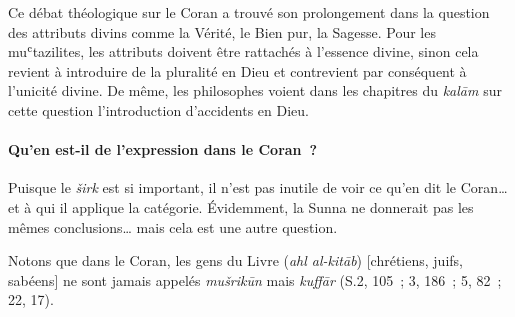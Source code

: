   Ce débat
théologique sur le Coran a trouvé son prolongement dans la question des
attributs divins comme la Vérité, le Bien pur, la Sagesse. Pour les
muʿtazilites, les attributs doivent être rattachés à l'essence divine,
sinon cela revient à introduire de la pluralité en Dieu et contrevient
par conséquent à l'unicité divine. De même, les philosophes voient dans
les chapitres du \textit{kalām} sur cette question l'introduction d'accidents en
Dieu.

\paragraph{Qu'en est-il de l'expression dans le Coran~?} Puisque le \emph{širk} est
si important, il n'est pas inutile de voir ce qu'en dit le Coran\ldots{}
et à qui il applique la catégorie. Évidemment, la Sunna ne donnerait pas
les mêmes conclusions\ldots{} mais cela est une autre question.

Notons que dans le Coran, les gens du Livre (\emph{ahl al-kitāb})
{[}chrétiens, juifs, sabéens{]} ne sont jamais appelés \emph{mušrikūn}
mais \emph{kuffār} (S.2, 105~; 3, 186~; 5, 82~; 22, 17).

